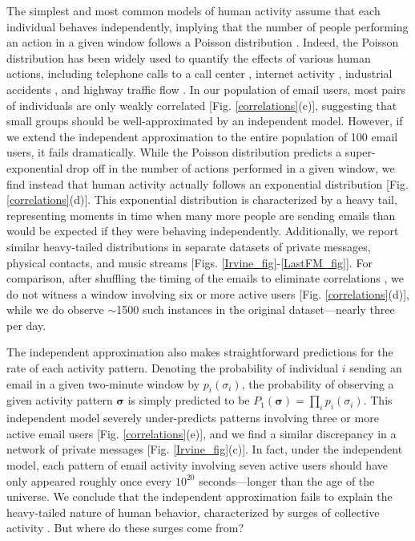 \documentclass[aps,reprint,superscriptaddress,amsmath,amssymb,longbibliography]{revtex4-1}
\begin{document}
The simplest and most common models of human activity assume that each individual behaves independently, implying that the number of people performing an action in a given window follows a Poisson distribution \cite{Haight-01}. Indeed, the Poisson distribution has been widely used to quantify the effects of various human actions, including telephone calls to a call center \cite{Rasch-01}, internet activity \cite{Karagiannis-01}, industrial accidents \cite{Haight-01,Rasch-01}, and highway traffic flow \cite{Gerlough-01}. In our population of email users, most pairs of individuals are only weakly correlated [Fig. \ref{correlations}(c)], suggesting that small groups should be well-approximated by an independent model. However, if we extend the independent approximation to the entire population of 100 email users, it fails dramatically. While the Poisson distribution predicts a super-exponential drop off in the number of actions performed in a given window, we find instead that human activity actually follows an exponential distribution [Fig. \ref{correlations}(d)]. This exponential distribution is characterized by a heavy tail, representing moments in time when many more people are sending emails than would be expected if they were behaving independently. Additionally, we report similar heavy-tailed distributions in separate datasets of private messages, physical contacts, and music streams [Figs. \ref{Irvine_fig}-\ref{LastFM_fig}]. For comparison, after shuffling the timing of the emails to eliminate correlations \cite{Schneidman-01}, we do not witness a window involving six or more active users [Fig. \ref{correlations}(d)], while we do observe $\sim$1500 such instances in the original dataset---nearly three per day.

The independent approximation also makes straightforward predictions for the rate of each activity pattern. Denoting the probability of individual $i$ sending an email in a given two-minute window by $p_i(\sigma_i)$, the probability of observing a given activity pattern $\bm{\sigma}$ is simply predicted to be $P_1(\bm{\sigma}) = \prod_i p_i(\sigma_i)$. This independent model severely under-predicts patterns involving three or more active email users [Fig. \ref{correlations}(e)], and we find a similar discrepancy in a network of private messages [Fig. \ref{Irvine_fig}(c)]. In fact, under the independent model, each pattern of email activity involving seven active users should have only appeared roughly once every $10^{20}$ seconds---longer than the age of the universe. We conclude that the independent approximation fails to explain the heavy-tailed nature of human behavior, characterized by surges of collective activity \cite{Candia-01,Crane-01,Peng-01,Bagrow-01}. But where do these surges come from?
\end{document}
